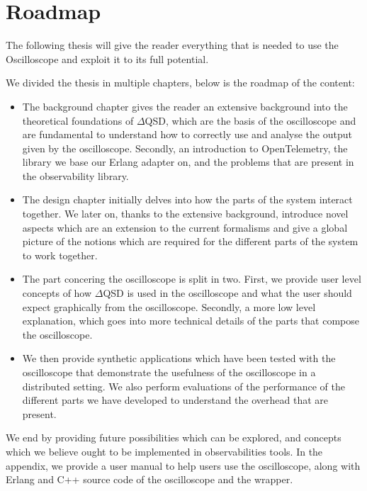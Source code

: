 \section{Roadmap}
    The following thesis will give the reader everything that is needed to use the Oscilloscope and exploit it to its full potential.

    We divided the thesis in multiple chapters, below is the roadmap of the content:
    \begin{itemize}
        \item The background chapter gives the reader an extensive background into the theoretical foundations of $\Delta$QSD, which are the basis of the oscilloscope and are fundamental to understand how to correctly use and analyse the output given by the oscilloscope. Secondly, an introduction to OpenTelemetry, the library we base our Erlang adapter on, and the problems that are present in the observability library.
        \item The design chapter initially delves into how the parts of the system interact together. We later on, thanks to the extensive background, introduce novel aspects which are an extension to the current formalisms and give a global picture of the notions which are required for the different parts of the system to work together.
        \item The part concering the oscilloscope is split in two. First, we provide user level concepts of how $\Delta$QSD is used in the oscilloscope and what the user should expect graphically from the oscilloscope.
            Secondly, a more low level explanation, which goes into more technical details of the parts that compose the oscilloscope.
        \item We then provide synthetic applications which have been tested with the oscilloscope that demonstrate the usefulness of the oscilloscope in a distributed setting. We also perform evaluations of the performance of the different parts we have developed to understand the overhead that are present.
    \end{itemize}

    We end by providing future possibilities which can be explored, and concepts which we believe ought to be implemented in observabilities tools. 
    In the appendix, we provide a user manual to help users use the oscilloscope, along with Erlang and C++ source code of the oscilloscope and the wrapper.
